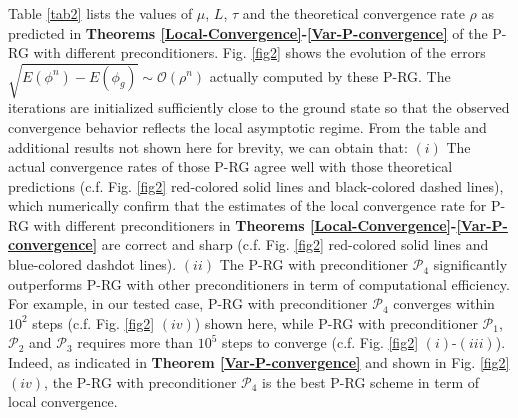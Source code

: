 \documentclass[preprint,3p]{elsarticle}
\begin{document}
Table \ref{tab2} lists the values of $\mu$, $L$,  $\tau$ and the theoretical convergence rate $\rho$ as predicted in \textbf{Theorems 
\ref{Local-Convergence}-\ref{Var-P-convergence}} of the P-RG with different preconditioners.  Fig. \ref{fig2} shows the evolution of the errors 
$\sqrt{E(\phi^n)-E(\phi_g)}\sim \mathcal{O}(\rho^n)$ actually computed by these P-RG. {The iterations are initialized sufficiently close to the ground state so that the observed convergence behavior reflects the local asymptotic regime.} From the table and additional results not shown here for brevity, we can obtain that: 
$(i)$ The actual convergence rates of those P-RG agree  well with those theoretical predictions (c.f.  Fig. \ref{fig2} red-colored solid lines and black-colored dashed lines), 
which numerically confirm that the estimates of the local convergence rate for P-RG with different preconditioners  in \textbf{Theorems  \ref{Local-Convergence}-\ref{Var-P-convergence}} 
are correct and sharp (c.f.   Fig. \ref{fig2} red-colored solid lines and blue-colored dashdot lines). 
$(ii)$ The P-RG with preconditioner $\mathcal{P}_4$ significantly outperforms  P-RG with other preconditioners in term of computational efficiency.  For example, in our tested case, 
P-RG with  preconditioner $\mathcal{P}_4$ 
converges within $10^2$ steps  (c.f.  Fig. \ref{fig2} $(iv)$) shown here, while 
P-RG with  preconditioner  $\mathcal{P}_1$,  $\mathcal{P}_2$ and  $\mathcal{P}_3$ requires more than $10^5$  steps to converge (c.f.  Fig. \ref{fig2} $(i)$-$(iii)$). 
Indeed, as indicated in \textbf{Theorem \ref{Var-P-convergence}} and shown in  Fig. \ref{fig2} $(iv)$, the P-RG with  preconditioner $\mathcal{P}_4$ is the best P-RG scheme in term  of local convergence.



\end{document}

